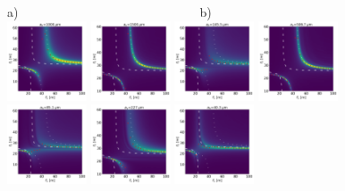 \documentclass[9pt,twocolumn,twoside]{osajnl}
\begin{document}
\begin{figure}[H]
    \centering
    a)~~~~~~~~~~~~~~~~~~~~~~~~~~~~~b) \\
    \includegraphics[width=0.21\textwidth]{figures/H_3.png}
    \includegraphics[width=0.21\textwidth]{figures/V_3.png}
    \includegraphics[width=0.21\textwidth]{figures/H_2.png}
    \includegraphics[width=0.21\textwidth]{figures/V_2.png}    
    \includegraphics[width=0.21\textwidth]{figures/H_1.png}
    \includegraphics[width=0.21\textwidth]{figures/V_1.png}
    \includegraphics[width=0.21\textwidth]{figures/H_0.png}

\end{figure}
\end{document}
